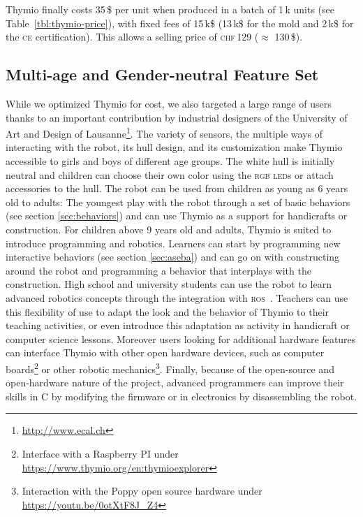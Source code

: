\documentclass[letterpaper, 10 pt, conference]{ieeeconf}  %
\begin{document}
Thymio finally costs 35\,\$ per unit when produced in a batch of 1\,k units (see Table~\ref{tbl:thymio-price}), with fixed fees of 15\,k\$ (13\,k\$ for the mold and 2\,k\$ for the \textsc{ce} certification).
This allows a selling price of \textsc{chf}\,129 ($\approx$ 130\,\$).

\subsection{Multi-age and Gender-neutral Feature Set}
\label{sec:multi}

While we optimized Thymio for cost, we also targeted a large range of users thanks to an important contribution by industrial designers of the University of Art and Design of Lausanne\footnote{\url{http://www.ecal.ch}}.
The variety of sensors, the multiple ways of interacting with the robot, its hull design, and its customization make Thymio accessible to girls and boys of different age groups.
The white hull is initially neutral and children can choose their own color using the \textsc{rgb} \textsc{led}s or attach accessories to the hull.
The robot can be used from children as young as 6 years old to adults:
The youngest play with the robot through a set of basic behaviors (see section \ref{sec:behaviors}) and can use Thymio as a support for handicrafts or construction.
For children above 9 years old and adults, Thymio is suited to introduce programming and robotics.
Learners can start by programming new interactive behaviors (see section \ref{sec:aseba}) and can go on with constructing around the robot and programming a behavior that interplays with the construction.
High school and university students can use the robot to learn advanced robotics concepts through the integration with \textsc{ros}~\cite{quigley2009ros}.
Teachers can use this flexibility of use to adapt the look and the behavior of Thymio to their teaching activities, or even introduce this adaptation as activity in handicraft or computer science lessons.
Moreover users looking for additional hardware features can interface Thymio with other open hardware devices, such as computer boards\footnote{Interface with a Raspberry PI under \url{https://www.thymio.org/en:thymioexplorer}} or other robotic mechanics\footnote{Interaction with the Poppy open source hardware under \url{https://youtu.be/0otXtF8J_Z4}}.
Finally, because of the open-source and open-hardware nature of the project, advanced programmers can improve their skills in C by modifying the firmware or in electronics by disassembling the robot.
\end{document}
